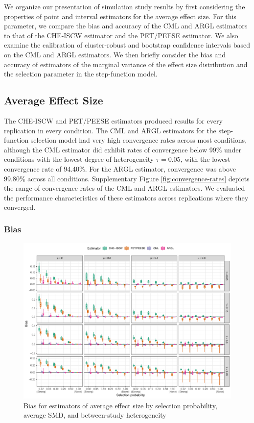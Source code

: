 \documentclass[
  american,
  man, donotrepeattitle,floatsintext]{apa7}
\begin{document}
We organize our presentation of simulation study results by first considering the properties of point and interval estimators for the average effect size.
For this parameter, we compare the bias and accuracy of the CML and ARGL estimators to that of the CHE-ISCW estimator and the PET/PEESE estimator.
We also examine the calibration of cluster-robust and bootstrap confidence intervals based on the CML and ARGL estimators.
We then briefly consider the bias and accuracy of estimators of the marginal variance of the effect size distribution and the selection parameter in the step-function model.

\subsection{Average Effect Size}\label{average-effect-size}

The CHE-ISCW and PET/PEESE estimators produced results for every replication in every condition.
The CML and ARGL estimators for the step-function selection model had very high convergence rates across most conditions, although the CML estimator did exhibit rates of convergence below 99\% under conditions with the lowest degree of heterogeneity \(\tau = 0.05\), with the lowest convergence rate of 94.40\%.
For the ARGL estimator, convergence was above 99.80\% across all conditions.
Supplementary Figure \ref{fig:convergence-rates} depicts the range of convergence rates of the CML and ARGL estimators.
We evaluated the performance characteristics of these estimators across replications where they converged.

\subsubsection{Bias}\label{bias}

\begin{figure}
\includegraphics{step-function-selection-models-with-dependent-effects_files/figure-latex/mu-bias-1} \caption{Bias for estimators of average effect size by selection probability, average SMD, and between-study heterogeneity}\label{fig:mu-bias}
\end{figure}
\end{document}
